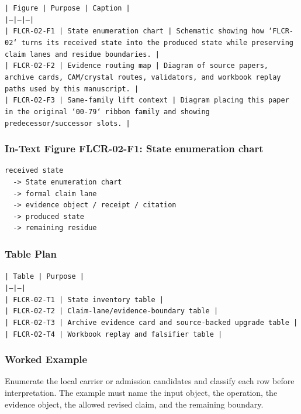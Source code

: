 \documentclass[11pt]{article}
\begin{document}
\noindent\texttt{| Figure | Purpose | Caption |}\\
\noindent\texttt{|---|---|---|}\\
\noindent\texttt{| FLCR-02-F1 | State enumeration chart | Schematic showing how `FLCR-02` turns its received state into the produced state while preserving claim lanes and residue boundaries. |}\\
\noindent\texttt{| FLCR-02-F2 | Evidence routing map | Diagram of source papers, archive cards, CAM/crystal routes, validators, and workbook replay paths used by this manuscript. |}\\
\noindent\texttt{| FLCR-02-F3 | Same-family lift context | Diagram placing this paper in the original `00-79` ribbon family and showing predecessor/successor slots. |}\\

\subsubsection*{In-Text Figure FLCR-02-F1: State enumeration chart}

\begin{verbatim}
received state
  -> State enumeration chart
  -> formal claim lane
  -> evidence object / receipt / citation
  -> produced state
  -> remaining residue
\end{verbatim}

\subsubsection*{Table Plan}

\noindent\texttt{| Table | Purpose |}\\
\noindent\texttt{|---|---|}\\
\noindent\texttt{| FLCR-02-T1 | State inventory table |}\\
\noindent\texttt{| FLCR-02-T2 | Claim-lane/evidence-boundary table |}\\
\noindent\texttt{| FLCR-02-T3 | Archive evidence card and source-backed upgrade table |}\\
\noindent\texttt{| FLCR-02-T4 | Workbook replay and falsifier table |}\\

\subsubsection*{Worked Example}

Enumerate the local carrier or admission candidates and classify each row before interpretation. The example must name the input object, the operation,
the evidence object, the allowed revised claim, and the remaining boundary.
\end{document}
